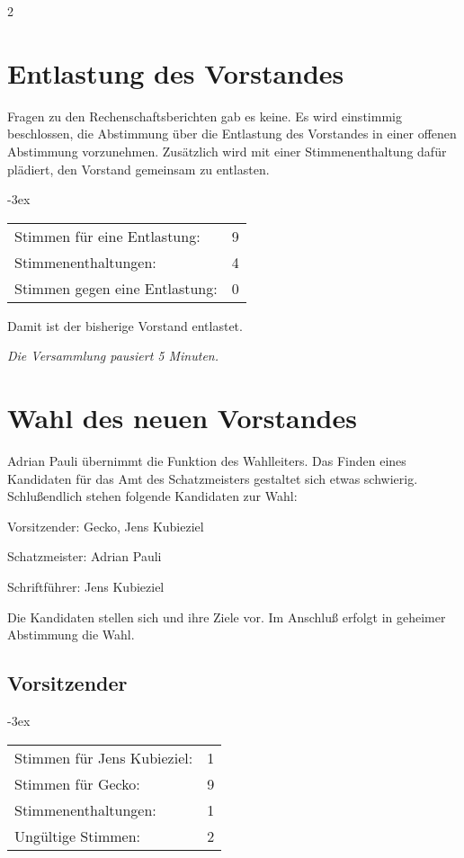 \documentclass[]{scrartcl}
\newenvironment{packed_item}{
\begin{itemize}
\setlength{\itemsep}{-5pt}
\setlength{\parsep}{0pt}
}{\end{itemize}}
\newenvironment{eingerueckt}{
\begin{addmargin*}[3ex]{-3ex}
\begin{minipage}{\linewidth}
}{
\end{minipage}
\end{addmargin*}}
\newcommand{\qbi}{Jens Kubieziel}
\newcommand{\adrian}{Adrian Pauli}
\newcommand{\gecko}{Gecko}
\begin{document}
\begin{multicols}{2}
\section{Entlastung des Vorstandes}
Fragen zu den Rechenschaftsberichten gab es keine. Es wird einstimmig
beschlossen, die Abstimmung über die Entlastung des Vorstandes in einer
offenen Abstimmung vorzunehmen. Zusätzlich wird mit einer Stimmenenthaltung
dafür plädiert, den Vorstand gemeinsam zu entlasten.

\begin{eingerueckt}
\begin{tabular}{lr}
Stimmen für eine Entlastung: & 9 \\
Stimmenenthaltungen: & 4 \\
Stimmen gegen eine Entlastung: & 0
\end{tabular}
\end{eingerueckt}

Damit ist der bisherige Vorstand entlastet.

\textsl{Die Versammlung pausiert 5 Minuten.}

\section{Wahl des neuen Vorstandes}
\adrian{} übernimmt die Funktion des Wahlleiters. Das Finden eines Kandidaten
für das Amt des Schatzmeisters gestaltet sich etwas schwierig. Schlußendlich
stehen folgende Kandidaten zur Wahl:
\begin{packed_item}
\item Vorsitzender: \gecko{}, \qbi{}
\item Schatzmeister: \adrian{}
\item Schriftführer: \qbi{}
\end{packed_item}
Die Kandidaten stellen sich und ihre Ziele vor. Im Anschluß erfolgt in
geheimer Abstimmung die Wahl.

\subsection{Vorsitzender}
\begin{eingerueckt}
\begin{tabular}{lr}
Stimmen für \qbi{}: & 1 \\
Stimmen für \gecko{}: & 9 \\
Stimmenenthaltungen: & 1 \\
Ungültige Stimmen: & 2
\end{tabular}
\end{eingerueckt}


\end{multicols}
\end{document}
